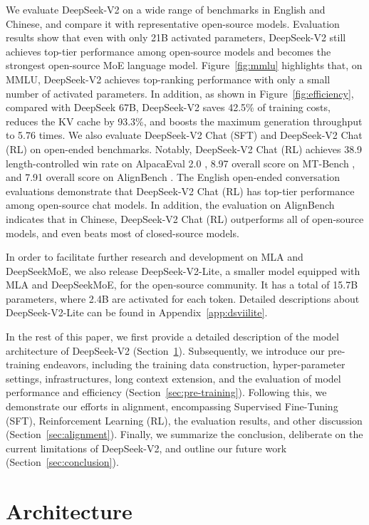 \documentclass[11pt, a4paper, logo, copyright, nonumbering]{deepseek}
\newcommand{\dsvi}{DeepSeek 67B}
\newcommand{\dsvii}{DeepSeek-V2}
\newcommand{\dsviisft}{DeepSeek-V2 Chat (SFT)}
\newcommand{\dsviirl}{DeepSeek-V2 Chat (RL)}
\begin{document}
\begin{CJK*}{UTF8}{gbsn}
We evaluate \dsvii{} on a wide range of benchmarks in English and Chinese, and compare it with representative open-source models.
Evaluation results show that even with only 21B activated parameters, DeepSeek-V2 still achieves top-tier performance among open-source models and becomes the strongest open-source MoE language model. 
Figure~\ref{fig:mmlu} highlights that, on MMLU, \dsvii{} achieves top-ranking performance with only a small number of activated parameters. 
In addition, as shown in Figure~\ref{fig:efficiency}, compared with \dsvi{}, \dsvii{} saves 42.5\% of training costs, reduces the KV cache by 93.3\%, and boosts the maximum generation throughput to 5.76 times. 
We also evaluate \dsviisft{} and \dsviirl{} on open-ended benchmarks. 
Notably, \dsviirl{} achieves 38.9 length-controlled win rate on AlpacaEval 2.0 \citep{alpaca2.0}, 8.97 overall score on MT-Bench \citep{mtbench}, and 7.91 overall score on AlignBench \citep{align_bench}. 
The English open-ended conversation evaluations demonstrate that \dsviirl{} has top-tier performance among open-source chat models. 
In addition, the evaluation on AlignBench indicates that in Chinese, \dsviirl{} outperforms all of open-source models, and even beats most of closed-source models. 

In order to facilitate further research and development on MLA and DeepSeekMoE, we also release DeepSeek-V2-Lite, a smaller model equipped with MLA and DeepSeekMoE, for the open-source community. 
It has a total of 15.7B parameters, where 2.4B are activated for each token. 
Detailed descriptions about DeepSeek-V2-Lite can be found in Appendix~\ref{app:dsviilite}.

In the rest of this paper, we first provide a detailed description of the model architecture of \dsvii{} (Section~\ref{sec:arch}). 
Subsequently, we introduce our pre-training endeavors, including the training data construction, hyper-parameter settings, infrastructures, long context extension, and the evaluation of model performance and efficiency (Section~\ref{sec:pre-training}). 
Following this, we demonstrate our efforts in alignment, encompassing Supervised Fine-Tuning (SFT), Reinforcement Learning (RL), the evaluation results, and other discussion (Section~\ref{sec:alignment}). 
Finally, we summarize the conclusion, deliberate on the current limitations of \dsvii{}, and outline our future work (Section~\ref{sec:conclusion}). 

\section{Architecture}
\label{sec:arch}


\end{CJK*}
\end{document}
